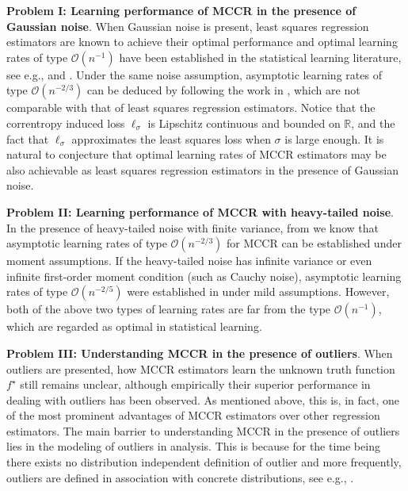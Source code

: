 \documentclass[11pt]{article}
\begin{document}
\noindent\textbf{Problem I: Learning performance of MCCR in the presence of Gaussian noise}. When Gaussian noise is present, least squares regression estimators are known to achieve their optimal performance and optimal learning rates of type $\mathcal{O}(n^{-1})$ have been established in the statistical learning literature, see e.g.,  \cite{wang2011optimal} and \cite{guo2013concentration}. Under the same noise assumption, asymptotic learning rates of type $\mathcal{O}(n^{-2/3})$ can be deduced by following the work in \cite{fenglearning}, which are not comparable with that of least squares regression estimators. Notice that the correntropy induced loss $\ell_\sigma$ is Lipschitz continuous and bounded on $\mathbb{R}$, and the fact that $\ell_\sigma$ approximates the least squares loss when $\sigma$ is large enough. It is natural to conjecture that optimal learning rates of MCCR estimators may be also achievable as least squares regression estimators in the presence of Gaussian noise.       
\medskip

\noindent\textbf{Problem II: Learning performance of MCCR with heavy-tailed noise}. In the presence of heavy-tailed noise with finite variance, from \cite{fenglearning} we know that asymptotic learning rates of type $\mathcal{O}(n^{-2/3})$ for MCCR can be established under moment assumptions. If the heavy-tailed noise has infinite variance or even infinite first-order moment condition (such as Cauchy noise), asymptotic learning rates of type $\mathcal{O}(n^{-2/5})$ were established in \cite{feng2017statistical} under mild assumptions. However, both of the above two types of learning rates are far from the type $\mathcal{O}(n^{-1})$, which are regarded as optimal in statistical learning.    
\medskip

\noindent\textbf{Problem III: Understanding MCCR in the presence of outliers}. When outliers are presented, how MCCR estimators learn the unknown truth function $f^\star$ still remains unclear, although empirically their superior performance in dealing with outliers has been observed. As mentioned above, this is, in fact, one of the most prominent advantages of MCCR estimators over other regression estimators. The main barrier to understanding MCCR in the presence of outliers lies in the modeling of outliers in analysis. This is because for the time being there exists no distribution independent definition of outlier and more frequently, outliers are defined in association with concrete distributions, see e.g., \cite{hawkins1980identification,rousseeuw2005robust,aggarwal2015outlier}. 
\end{document}
